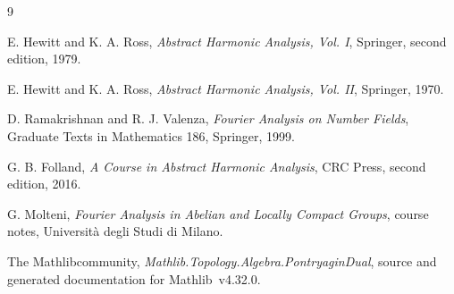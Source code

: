 \documentclass[11pt]{article}
\theoremstyle{definition}
\theoremstyle{remark}
\newcommand{\mathlib}{\textsf{Mathlib}}
\begin{document}
\begin{thebibliography}{9}

E. Hewitt and K. A. Ross,
\emph{Abstract Harmonic Analysis, Vol. I},
Springer, second edition, 1979.

E. Hewitt and K. A. Ross,
\emph{Abstract Harmonic Analysis, Vol. II},
Springer, 1970.

D. Ramakrishnan and R. J. Valenza,
\emph{Fourier Analysis on Number Fields},
Graduate Texts in Mathematics 186, Springer, 1999.

G. B. Folland,
\emph{A Course in Abstract Harmonic Analysis},
CRC Press, second edition, 2016.

G. Molteni,
\emph{Fourier Analysis in Abelian and Locally Compact Groups},
course notes, Universit\`a degli Studi di Milano.

The \mathlib community,
\emph{Mathlib.Topology.Algebra.PontryaginDual},
source and generated documentation for \mathlib~v4.32.0.

\end{thebibliography}
\end{document}
